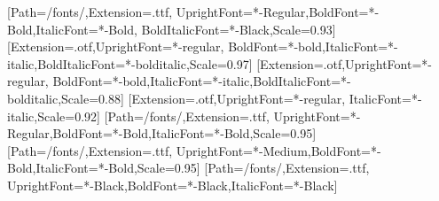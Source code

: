 %    
\usepackage{\ACNroot/templates/shared-style}
\usepackage{xepersian}

[Path=\ACNroot/fonts/,Extension=.ttf,
  UprightFont=*-Regular,BoldFont=*-Bold,ItalicFont=*-Bold,
  BoldItalicFont=*-Black,Scale=0.93]  %
[Extension=.otf,UprightFont=*-regular,
  BoldFont=*-bold,ItalicFont=*-italic,BoldItalicFont=*-bolditalic,Scale=0.97]
[Extension=.otf,UprightFont=*-regular,
  BoldFont=*-bold,ItalicFont=*-italic,BoldItalicFont=*-bolditalic,Scale=0.88]
[Extension=.otf,UprightFont=*-regular,
  ItalicFont=*-italic,Scale=0.92]
[Path=\ACNroot/fonts/,Extension=.ttf,
  UprightFont=*-Regular,BoldFont=*-Bold,ItalicFont=*-Bold,Scale=0.95]
[Path=\ACNroot/fonts/,Extension=.ttf,
  UprightFont=*-Medium,BoldFont=*-Bold,ItalicFont=*-Bold,Scale=0.95]
[Path=\ACNroot/fonts/,Extension=.ttf,
  UprightFont=*-Black,BoldFont=*-Black,ItalicFont=*-Black]
\linespread{1.25}
 

\newif\ifACNrtl \ACNrtltrue
\renewcommand{\bil}[2]{\rl{#2}}
\renewcommand{\ACNheadfont}{\ACNfahead}
\renewcommand{\ACNfigsetup}{\tikzset{every node/.append style={execute at begin node={\latinfont\sffamily}}}}
\renewcommand{\ACNdispfont}{\ACNfadisplay}
\renewcommand{\ACNlatin}[1]{\lr{#1}}
\let\ACNamstext\text
\renewcommand{\text}[1]{\ACNamstext{\lr{#1}}}
\newcommand{\ACNnodetext}[1]{\rl{#1}}
\newcommand{\ACNothertext}[1]{\lr{#1}}
\newcommand{\ACNotherfont}{\latinfont\sffamily}
\newcommand{\ACNalign}{right}
\newcommand{\ACNotheralign}{right}
\newcommand{\fa}[1]{#1}
\renewcommand{\acro}[1]{\lr{\textsf{#1}}}
\renewcommand{\msg}[1]{\lr{\textsf{#1}}}
\renewcommand{\iface}[1]{\lr{\textsf{\itshape #1}}}
\renewcommand{\spec}[1]{\lr{\textsf{#1}}}





